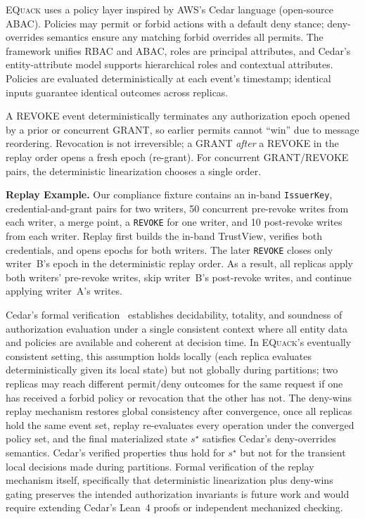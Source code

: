 \documentclass[10pt,journal,compsoc]{IEEEtran}
\newcommand{\equack}{\textsc{EQuack}}
\begin{document}
\equack{} uses a policy layer inspired by AWS's Cedar language (open-source ABAC). Policies may permit or forbid actions with a default deny stance; deny-overrides semantics ensure any matching forbid overrides all permits. The framework unifies RBAC and ABAC, roles are principal attributes, and Cedar's entity-attribute model supports hierarchical roles and contextual attributes. Policies are evaluated deterministically at each event's timestamp; identical inputs guarantee identical outcomes across replicas.

A REVOKE event deterministically terminates any authorization epoch opened by a prior or concurrent GRANT, so earlier permits cannot ``win'' due to message reordering. Revocation is not irreversible; a GRANT \emph{after} a REVOKE in the replay order opens a fresh epoch (re-grant). For concurrent GRANT/REVOKE pairs, the deterministic linearization chooses a single order.

\textbf{Replay Example.} Our compliance fixture contains an in-band \texttt{IssuerKey}, credential-and-grant pairs for two writers, 50 concurrent pre-revoke writes from each writer, a merge point, a \texttt{REVOKE} for one writer, and 10 post-revoke writes from each writer. Replay first builds the in-band TrustView, verifies both credentials, and opens epochs for both writers. The later \texttt{REVOKE} closes only writer~B's epoch in the deterministic replay order. As a result, all replicas apply both writers' pre-revoke writes, skip writer~B's post-revoke writes, and continue applying writer~A's writes.

Cedar's formal verification~\cite{cutler2024cedar} establishes decidability, totality, and soundness of authorization evaluation under a single consistent context where all entity data and policies are available and coherent at decision time. In \equack{}'s eventually consistent setting, this assumption holds locally (each replica evaluates deterministically given its local state) but not globally during partitions; two replicas may reach different permit/deny outcomes for the same request if one has received a forbid policy or revocation that the other has not. The deny-wins replay mechanism restores global consistency after convergence, once all replicas hold the same event set, replay re-evaluates every operation under the converged policy set, and the final materialized state $s^\star$ satisfies Cedar's deny-overrides semantics. Cedar's verified properties thus hold for $s^\star$ but not for the transient local decisions made during partitions. Formal verification of the replay mechanism itself, specifically that deterministic linearization plus deny-wins gating preserves the intended authorization invariants is future work and would require extending Cedar's Lean~4 proofs or independent mechanized checking.
\end{document}
